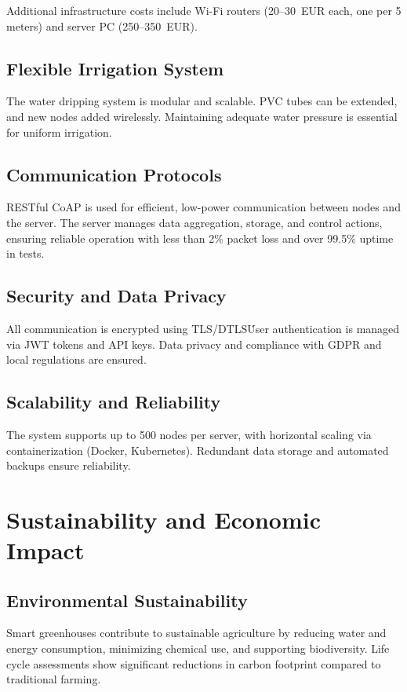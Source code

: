 \documentclass[12pt,a4paper]{article}
\begin{document}
Additional infrastructure costs include Wi-Fi routers (20--30~EUR each, one per 5 meters) and server PC (250--350~EUR).

\subsection{Flexible Irrigation System}
The water dripping system is modular and scalable. PVC tubes can be extended, and new nodes added wirelessly. Maintaining adequate water pressure is essential for uniform irrigation.

\subsection{Communication Protocols}
RESTful CoAP is used for efficient, low-power communication between nodes and the server. The server manages data aggregation, storage, and control actions, ensuring reliable operation with less than 2\% packet loss and over 99.5\% uptime in tests.

\subsection{Security and Data Privacy}
All communication is encrypted using TLS/DTLS\. User authentication is managed via JWT tokens and API keys. Data privacy and compliance with GDPR and local regulations are ensured.

\subsection{Scalability and Reliability}
The system supports up to 500 nodes per server, with horizontal scaling via containerization (Docker, Kubernetes). Redundant data storage and automated backups ensure reliability.

\section{Sustainability and Economic Impact}
\subsection{Environmental Sustainability}
Smart greenhouses contribute to sustainable agriculture by reducing water and energy consumption, minimizing chemical use, and supporting biodiversity. Life cycle assessments show significant reductions in carbon footprint compared to traditional farming.
\end{document}
